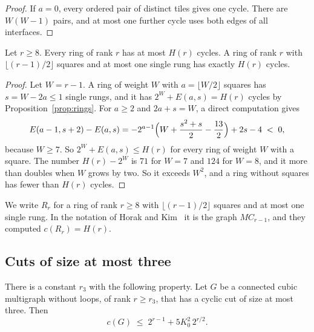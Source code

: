 \begin{proof}
If $a=0$, every ordered pair of distinct tiles gives one cycle. There are $W(W-1)$ pairs, and at
most one further cycle uses both edges of all interfaces.
\end{proof}

\begin{corollary}\label{cor:ringmax}
Let $r\ge8$. Every ring of rank $r$ has at most $H(r)$ cycles. A ring of rank $r$ with
$\lfloor(r-1)/2\rfloor$ squares and at most one single rung has exactly $H(r)$ cycles.
\end{corollary}

\begin{proof}
Let $W=r-1$. A ring of weight $W$ with $a=\lfloor W/2\rfloor$ squares has $s=W-2a\le1$ single
rungs, and it has $2^{W}+E(a,s)=H(r)$ cycles by Proposition~\ref{prop:rings}. For $a\ge2$ and
$2a+s=W$, a direct computation gives
\[
  E(a-1,s+2)-E(a,s)=-2^{a-1}\Bigl(W+\frac{s^{2}+s}2-\frac{13}2\Bigr)+2s-4\;<\;0,
\]
because $W\ge7$. So $2^{W}+E(a,s)\le H(r)$ for every ring of weight $W$ with a square. The number
$H(r)-2^{W}$ is $71$ for $W=7$ and $124$ for $W=8$, and it more than doubles when $W$ grows by
two. So it exceeds $W^{2}$, and a ring without squares has fewer than $H(r)$ cycles.
\end{proof}

We write $R_r$ for a ring of rank $r\ge8$ with $\lfloor(r-1)/2\rfloor$ squares and at most one
single rung. In the notation of Horak and Kim~\cite{HK} it is the graph $MC_{r-1}$, and they
computed $c(R_r)=H(r)$.

\subsection{Cuts of size at most three}

\begin{proposition}\label{prop:threecut}
There is a constant $r_3$ with the following property. Let $G$ be a connected cubic multigraph
without loops, of rank $r\ge r_3$, that has a cyclic cut of size at most three. Then
\[
  c(G)\;\le\;2^{r-1}+5K_0^{2}\,2^{r/2}.
\]
\end{proposition}

